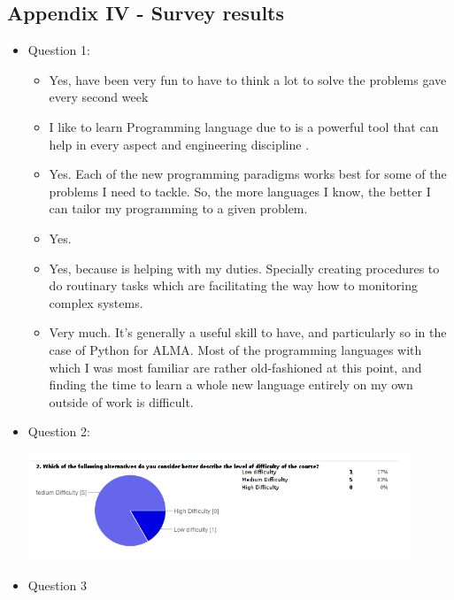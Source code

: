 \documentclass[letter, 10pt]{article}
\begin{document}
\subsection{Appendix IV - Survey results}
\label{cap:answers}

\begin{itemize}
    \item Question 1:\\
     \begin{itemize}
        \item Yes, have been very fun to have to think a lot to solve the problems gave every second week
        \item I like to learn Programming language due to is a powerful tool that can help in every aspect and engineering discipline .
        \item Yes. Each of the new programming paradigms works best for some of the problems I need to tackle. So, the more languages I know, the better I can tailor my programming to a given problem.
        \item Yes.
        \item Yes, because is helping with my duties. Specially creating procedures to do routinary tasks which are facilitating the way how to monitoring complex systems.
        \item Very much. It's generally a useful skill to have, and particularly so in the case of Python for ALMA. Most of the programming languages with which I was most familiar are rather old-fashioned at this point, and finding the time to learn a whole new language entirely on my own outside of work is difficult.
     \end{itemize}

    \item Question 2:
        \begin{center}
            \includegraphics[width=0.9\textwidth]{img/survey_2.png}
        \end{center}

    \item Question 3
    

\end{itemize}
\end{document}

